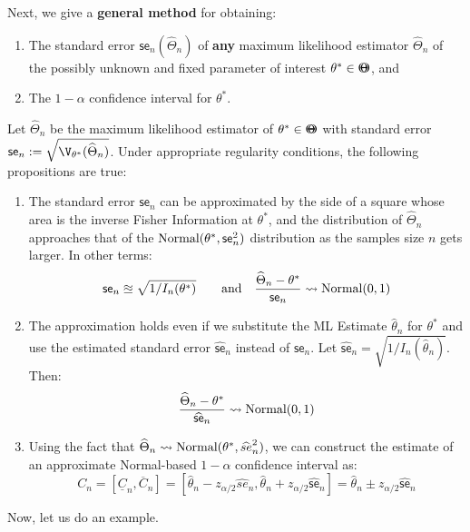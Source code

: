 Next, we give a {\bf general method} for obtaining:
\begin{enumerate}
\item
The standard error $\mathsf{se}_n(\widehat{\Theta}_n)$ of {\bf any} maximum likelihood estimator $\widehat{\Theta}_n$ of the possibly unknown and fixed parameter of interest $\theta^* \in {\Theta}\mspace{-11 mu}{\Theta}$, and
\item The $1-\alpha$ confidence interval for $\theta^*$.
\end{enumerate}

\begin{prop}
Let $\widehat{\Theta}_n$ be the maximum likelihood estimator of $\theta^* \in {\Theta}\mspace{-11 mu}{\Theta}$ with standard error $\mathsf{se}_n := \sqrt{\V_{\theta^*} (\widehat{\Theta}_n)}$.  Under appropriate regularity conditions, the following propositions are true:
\begin{enumerate}
\item The standard error $\mathsf{se}_n$ can be approximated by the side of a square whose area is the inverse Fisher Information at $\theta^*$, and the distribution of $\widehat{\Theta}_n$ approaches that of the $\mbox{{\rm Normal}}(\theta^*, \mathsf{se}_n^2)$ distribution as the samples size $n$ gets larger.  In other terms:
\[
\mathsf{se}_n \approxeq \sqrt{1/I_n(\theta^*)} \qquad \text{and} \quad \frac{\widehat{\Theta}_n-\theta^*}{\mathsf{se}_n} \rightsquigarrow \mbox{{\rm Normal}}(0,1)
\]
\item The approximation holds even if we substitute the ML Estimate $\widehat{\theta}_n$ for $\theta^*$ and use the estimated standard error $\widehat{\mathsf{se}}_n$ instead of $\mathsf{se}_n$.  Let $\widehat{\mathsf{se}}_n = \sqrt{1/I_n(\widehat{\theta}_n)}$.  Then:
\[
 \frac{\widehat{\Theta}_n-\theta^*}{\widehat{\mathsf{se}}_n} \rightsquigarrow \mbox{{\rm Normal}}(0,1)
\]
\item Using the fact that $\widehat{\Theta}_n \rightsquigarrow \mbox{{\rm Normal}}(\theta^*,\widehat{se}_n^2)$, we can construct the estimate of an approximate Normal-based $1-\alpha$ confidence interval as:
\[
C_n  =[\underline{C}_n, \overline{C}_n]= [\widehat{\theta}_n - z_{\alpha/2} \widehat{se}_n, \widehat{\theta}_n + z_{\alpha/2} \widehat{\mathsf{se}}_n]= \widehat{\theta}_n \pm z_{\alpha/2} \widehat{\mathsf{se}}_n
\]
\end{enumerate}
\end{prop}
Now, let us do an example.
